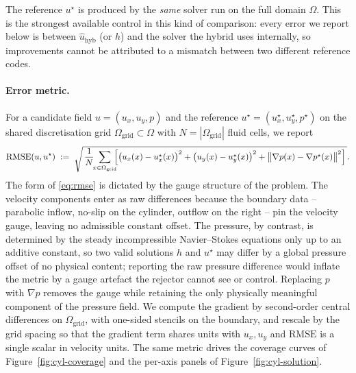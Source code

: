 The reference $u^\star$ is produced by the \emph{same} solver run
on the full domain $\Omega$. This is the strongest available control
in this kind of comparison: every error we report below is between
$\widehat{u}_{\mathrm{hyb}}$ (or $h$) and the solver the hybrid uses
internally, so improvements cannot be attributed to a mismatch
between two different reference codes.

\paragraph{Error metric.}
For a candidate field $u=(u_x,u_y,p)$ and the reference
$u^\star=(u_x^\star,u_y^\star,p^\star)$ on the shared discretisation
grid $\Omega_{\mathrm{grid}}\subset\Omega$ with $N=|\Omega_{\mathrm{grid}}|$
fluid cells, we report
\begin{equation}
  \mathrm{RMSE}(u,u^\star)
  \;:=\;
  \sqrt{\,
  \frac{1}{N}\!\!\sum_{x\in\Omega_{\mathrm{grid}}}\!\!
  \Bigl[
    \bigl(u_x(x)-u_x^\star(x)\bigr)^2
    +\bigl(u_y(x)-u_y^\star(x)\bigr)^2
    +\bigl\|\nabla p(x)-\nabla p^\star(x)\bigr\|^2
  \Bigr]\,}.
  \label{eq:rmse}
\end{equation}
The form of \eqref{eq:rmse} is dictated by the gauge structure of the
problem. The velocity components enter as raw differences because the
boundary data -- parabolic inflow, no-slip on the cylinder, outflow on
the right -- pin the velocity gauge, leaving no admissible constant
offset. The pressure, by contrast, is determined by the steady
incompressible Navier--Stokes equations only up to an additive
constant, so two valid solutions $h$ and $u^\star$ may differ by a
global pressure offset of no physical content; reporting the raw
pressure difference would inflate the metric by a gauge artefact the
rejector cannot see or control. Replacing $p$ with $\nabla p$ removes
the gauge while retaining the only physically meaningful component of
the pressure field. We compute the gradient by second-order central
differences on $\Omega_{\mathrm{grid}}$, with one-sided stencils on
the boundary, and rescale by the grid spacing so that the gradient
term shares units with $u_x,u_y$ and $\mathrm{RMSE}$ is a single
scalar in velocity units. The same metric drives the coverage curves
of Figure~\ref{fig:cyl-coverage} and the per-axis panels of
Figure~\ref{fig:cyl-solution}.

